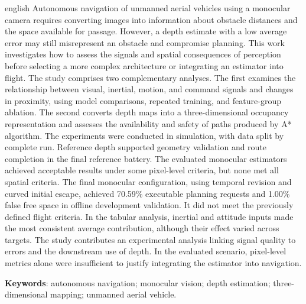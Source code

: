 
\begin{resumo}[Abstract]
\begin{otherlanguage*}{english}
Autonomous navigation of unmanned aerial vehicles using a monocular camera requires converting images into information about obstacle distances and the space available for passage. However, a depth estimate with a low average error may still misrepresent an obstacle and compromise planning. This work investigates how to assess the signals and spatial consequences of perception before selecting a more complex architecture or integrating an estimator into flight. The study comprises two complementary analyses. The first examines the relationship between visual, inertial, motion, and command signals and changes in proximity, using model comparisons, repeated training, and feature-group ablation. The second converts depth maps into a three-dimensional occupancy representation and assesses the availability and safety of paths produced by A* algorithm. The experiments were conducted in simulation, with data split by complete run. Reference depth supported geometry validation and route completion in the final reference battery. The evaluated monocular estimators achieved acceptable results under some pixel-level criteria, but none met all spatial criteria. The final monocular configuration, using temporal revision and curved initial escape, achieved 70.59\% executable planning requests and 1.00\% false free space in offline development validation. It did not meet the previously defined flight criteria. In the tabular analysis, inertial and attitude inputs made the most consistent average contribution, although their effect varied across targets. The study contributes an experimental analysis linking signal quality to errors and the downstream use of depth. In the evaluated scenario, pixel-level metrics alone were insufficient to justify integrating the estimator into navigation.

\vspace{\onelineskip}

\noindent
{\raggedright
\textbf{Keywords}: autonomous navigation; monocular vision; depth estimation; three-dimensional mapping; unmanned aerial vehicle.\par}
\end{otherlanguage*}
\end{resumo}
